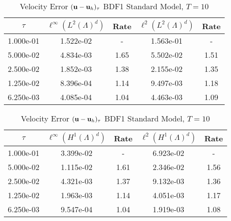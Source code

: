 \documentclass[letterpaper]{erdc}
\begin{document}
\begin{table}[h!]
  \parbox{.45\linewidth}{
  \tiny
  \centering
    \caption{Velocity Error $(\textbf{u} - \textbf{u}_h)_{\tau}$ BDF1 Standard Model, $T=10$}
    \begin{tabular}{c|c|c|c|c}
      $\tau$ &  $\ell^{\infty}\left(L^2(\Lambda)^d\right)$ &  Rate  &  $\ell^2\left(L^2(\Lambda)^d\right)$  &  Rate\\
      \hline
      1.000e-01 & 1.522e-02 &  -   & 1.563e-01 &  -  \\
      5.000e-02 & 4.834e-03 & 1.65 & 5.502e-02 & 1.51\\
      2.500e-02 & 1.852e-03 & 1.38 & 2.155e-02 & 1.35\\
      1.250e-02 & 8.396e-04 & 1.14 & 9.497e-03 & 1.18\\
      6.250e-03 & 4.085e-04 & 1.04 & 4.463e-03 & 1.09
    \end{tabular}
    }
    \hfill
    \parbox{.45\linewidth}{
    \tiny
    \centering
      \caption{Velocity Error $(\textbf{u} - \textbf{u}_h)_{\tau}$ BDF1 Standard Model, $T=10$}
      \begin{tabular}{c|c|c|c|c}
        $\tau$ &  $\ell^{\infty}\left(H^1(\Lambda)^d\right)$ &  Rate  &  $\ell^2\left(H^1(\Lambda)^d\right)$  &  Rate\\
        \hline
        1.000e-01 & 3.399e-02 &  -   & 6.923e-02 &  -  \\
        5.000e-02 & 1.115e-02 & 1.61 & 2.346e-02 & 1.56\\
        2.500e-02 & 4.321e-03 & 1.37 & 9.132e-03 & 1.36\\
        1.250e-02 & 1.963e-03 & 1.14 & 4.051e-03 & 1.17\\
        6.250e-03 & 9.547e-04 & 1.04 & 1.919e-03 & 1.08
      \end{tabular}
    }
\end{table}



%
%
\end{document}

